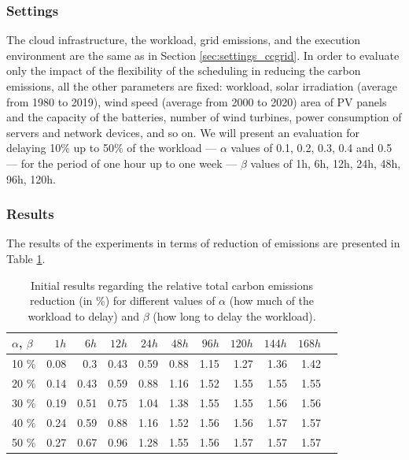 \subsubsection{Settings}

The cloud infrastructure, the workload, grid emissions, and the execution environment are the same as in Section  \ref{sec:settings_ccgrid}. In order to evaluate only the impact of the flexibility of the scheduling in reducing the carbon emissions, all the other parameters are fixed: workload, solar irradiation (average from 1980 to 2019), wind speed (average from 2000 to 2020) area of PV panels and the capacity of the batteries, number of wind turbines, power consumption of servers and network devices, and so on. We will present an evaluation for delaying 10\% up to 50\% of the workload --- $\alpha$ values of 0.1, 0.2, 0.3, 0.4 and 0.5 --- for the period of one hour up to one week --- $\beta$ values of 1h, 6h, 12h, 24h, 48h, 96h, 120h.

\subsubsection{Results}

 The results of the experiments in terms of reduction of  emissions are presented in Table \ref{tab:flex_scheduling}.

  \begin{table}[H]
    \caption{Initial results regarding the relative total carbon emissions reduction (in \%) for different values of $\alpha$ (how much of the workload to delay) and $\beta$ (how long to delay the workload).}\centering
    \label{tab:flex_scheduling}
    \begin{tabular}{|l|r|r|r|r|r|r|r|r|r|r|}
      \hline
      $\alpha$, $\beta$ &   \textbf{$ 1 h $} &   \textbf{$ 6 h $} &  \textbf{$ 12 h $} &  \textbf{$ 24 h $} &  \textbf{$ 48 h $} &  \textbf{$ 96 h$} &   \textbf{$ 120 h $} &   \textbf{$ 144 h$} &   \textbf{$ 168 h$}\\ 
      \hline
      10 \%   &  0.08 &  0.3 &  0.43 &  0.59 &  0.88 &  1.15 &  1.27 &  1.36 &  1.42 \\ 
      \hline
      20 \%   &  0.14 &  0.43 &  0.59 &  0.88 &  1.16 &  1.52 &  1.55 &  1.55 &  1.55 \\ 
      \hline
       30 \%   &  0.19 &  0.51 &  0.75 &  1.04 &  1.38 &  1.55 &  1.55 &  1.56 &  1.56 \\ 
      \hline
       40 \%  &  0.24 &  0.59 &  0.88 &  1.16 &  1.52 &  1.56 &  1.56 &  1.57 &  1.57 \\ 
      \hline
       50 \%   &  0.27 &  0.67 &  0.96 &  1.28 &  1.55 &  1.56 &  1.57 &  1.57 &  1.57 \\ 
      \hline
    \end{tabular}
  \end{table}

